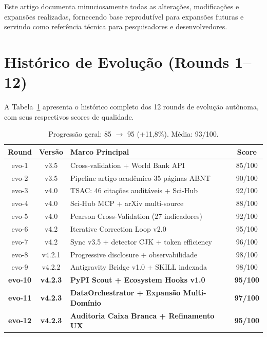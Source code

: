 \documentclass[12pt,a4paper]{article}
\begin{document}
Este artigo documenta minuciosamente todas as alterações, modificações e expansões realizadas, fornecendo base reprodutível para expansões futuras e servindo como referência técnica para pesquisadores e desenvolvedores.

\section{Histórico de Evolução (Rounds 1--12)}

A Tabela~\ref{tab:rounds} apresenta o histórico completo dos 12 rounds de evolução autônoma, com seus respectivos scores de qualidade.

\begin{table}[H]
  \centering
  \caption{Histórico completo dos Rounds de Evolução (AutoEvolve)}
  \label{tab:rounds}
  \begin{tabular}{c c l c}
    \toprule
    \textbf{Round} & \textbf{Versão} & \textbf{Marco Principal} & \textbf{Score} \\
    \midrule
    evo-1  & v3.5   & Cross-validation + World Bank API                    & 85/100 \\
    evo-2  & v3.5   & Pipeline artigo acadêmico 35 páginas ABNT            & 90/100 \\
    evo-3  & v4.0   & TSAC: 46 citações auditáveis + Sci-Hub               & 92/100 \\
    evo-4  & v4.0   & Sci-Hub MCP + arXiv multi-source                     & 88/100 \\
    evo-5  & v4.0   & Pearson Cross-Validation (27 indicadores)             & 92/100 \\
    evo-6  & v4.2   & Iterative Correction Loop v2.0                        & 95/100 \\
    evo-7  & v4.2   & Sync v3.5 + detector CJK + token efficiency           & 96/100 \\
    evo-8  & v4.2.1 & Progressive disclosure + observabilidade              & 98/100 \\
    evo-9  & v4.2.2 & Antigravity Bridge v1.0 + SKILL indexada              & 98/100 \\
    \textbf{evo-10} & \textbf{v4.2.3} & \textbf{PyPI Scout + Ecosystem Hooks v1.0}      & \textbf{95/100} \\
    \textbf{evo-11} & \textbf{v4.2.3} & \textbf{DataOrchestrator + Expansão Multi-Domínio} & \textbf{97/100} \\
    \textbf{evo-12} & \textbf{v4.2.3} & \textbf{Auditoria Caixa Branca + Refinamento UX}    & \textbf{95/100} \\
    \bottomrule
  \end{tabular}
  \caption*{\footnotesize Progressão geral: 85 $\rightarrow$ 95 (+11,8\%). Média: 93/100.}
\end{table}
\end{document}
